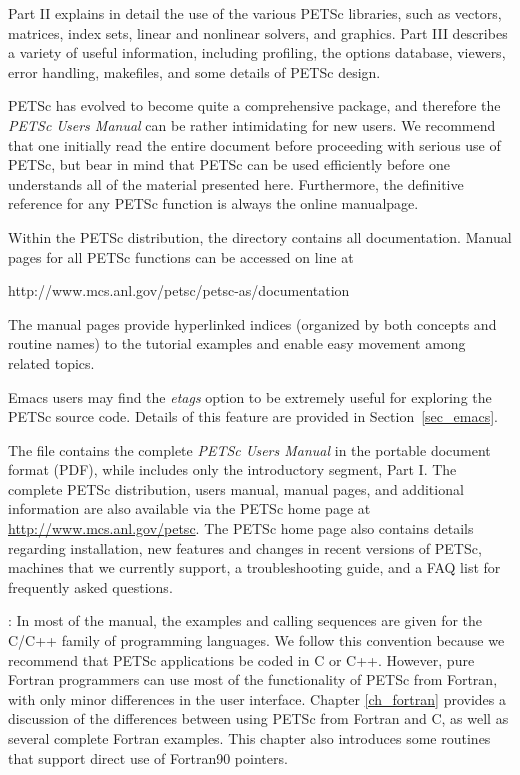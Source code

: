 Part II explains in detail the use of the various PETSc libraries,
such as vectors, matrices, index sets, linear and nonlinear
solvers, and graphics.  Part III describes a variety of useful
information, including profiling, the options database, viewers, error
handling, makefiles, and some details of
PETSc design.

\nocite{efficient}

PETSc has evolved to become quite a comprehensive package, and therefore the
{\em PETSc Users Manual} can be rather intimidating for new users. We
recommend that one initially read the entire document before proceeding with
serious use of PETSc, but bear in mind that PETSc can be used efficiently
before one understands all of the material presented here. Furthermore, the
definitive reference for any PETSc function is always the online manualpage.

\medskip \medskip

Within the PETSc distribution, the directory 
contains all documentation.
Manual pages for all PETSc functions can be
accessed on line at
\begin{tabbing}
  http://www.mcs.anl.gov/petsc/petsc-as/documentation
\end{tabbing}
The manual pages
provide hyperlinked indices (organized by
both concepts and routine names) to the tutorial examples and enable
easy movement among related topics.  

Emacs users may find the
{\em etags} option to be extremely useful for exploring the PETSc
source code.  Details of this feature are provided in
Section~\ref{sec_emacs}. 

The file  contains
the complete {\em PETSc Users Manual} in the portable document format (PDF), 
while  
includes only the introductory segment, Part I.   
The complete PETSc distribution, users
manual, manual pages, and additional information are also available via
the PETSc home page at
\href{http://www.mcs.anl.gov/petsc}{http://www.mcs.anl.gov/petsc}.  
The PETSc home page also
contains details regarding installation, new features and changes in recent
versions of PETSc, machines that we currently support, a
troubleshooting guide, and a FAQ list for frequently asked questions.

\medskip\medskip

: In most of the  
manual, the examples and calling sequences are given for the C/C++
family of programming languages.  We follow this convention because we
recommend that PETSc applications be coded in C or C++.
However, pure Fortran programmers can use most of the
functionality of PETSc from Fortran, with only minor differences in
the user interface.  Chapter \ref{ch_fortran} provides a discussion of the
differences between using PETSc from Fortran and C, as well as several
complete Fortran examples.  This chapter also introduces some
routines that support direct use of Fortran90 pointers.

